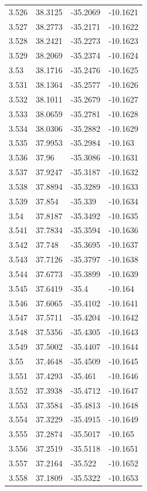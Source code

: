 \begin{tabular}{llll}
3.526 & 38.3125 & -35.2069 & -10.1621 \\
3.527 & 38.2773 & -35.2171 & -10.1622 \\
3.528 & 38.2421 & -35.2273 & -10.1623 \\
3.529 & 38.2069 & -35.2374 & -10.1624 \\
3.53 & 38.1716 & -35.2476 & -10.1625 \\
3.531 & 38.1364 & -35.2577 & -10.1626 \\
3.532 & 38.1011 & -35.2679 & -10.1627 \\
3.533 & 38.0659 & -35.2781 & -10.1628 \\
3.534 & 38.0306 & -35.2882 & -10.1629 \\
3.535 & 37.9953 & -35.2984 & -10.163 \\
3.536 & 37.96 & -35.3086 & -10.1631 \\
3.537 & 37.9247 & -35.3187 & -10.1632 \\
3.538 & 37.8894 & -35.3289 & -10.1633 \\
3.539 & 37.854 & -35.339 & -10.1634 \\
3.54 & 37.8187 & -35.3492 & -10.1635 \\
3.541 & 37.7834 & -35.3594 & -10.1636 \\
3.542 & 37.748 & -35.3695 & -10.1637 \\
3.543 & 37.7126 & -35.3797 & -10.1638 \\
3.544 & 37.6773 & -35.3899 & -10.1639 \\
3.545 & 37.6419 & -35.4 & -10.164 \\
3.546 & 37.6065 & -35.4102 & -10.1641 \\
3.547 & 37.5711 & -35.4204 & -10.1642 \\
3.548 & 37.5356 & -35.4305 & -10.1643 \\
3.549 & 37.5002 & -35.4407 & -10.1644 \\
3.55 & 37.4648 & -35.4509 & -10.1645 \\
3.551 & 37.4293 & -35.461 & -10.1646 \\
3.552 & 37.3938 & -35.4712 & -10.1647 \\
3.553 & 37.3584 & -35.4813 & -10.1648 \\
3.554 & 37.3229 & -35.4915 & -10.1649 \\
3.555 & 37.2874 & -35.5017 & -10.165 \\
3.556 & 37.2519 & -35.5118 & -10.1651 \\
3.557 & 37.2164 & -35.522 & -10.1652 \\
3.558 & 37.1809 & -35.5322 & -10.1653 \\

\end{tabular}
